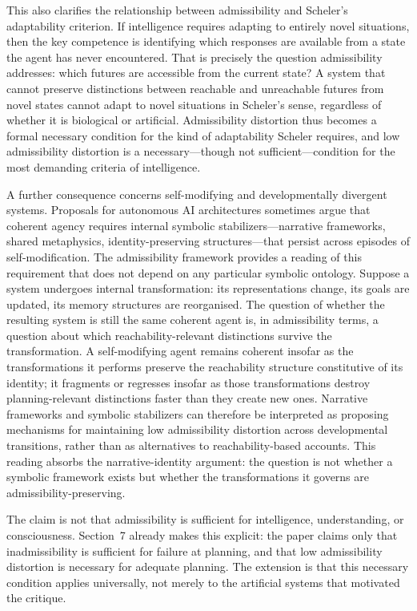 \documentclass[11pt, a4paper]{article}
\theoremstyle{plain}
\theoremstyle{definition}
\theoremstyle{remark}
\begin{document}
This also clarifies the relationship between admissibility and Scheler's adaptability criterion. If intelligence requires adapting to entirely novel situations, then the key competence is identifying which responses are available from a state the agent has never encountered. That is precisely the question admissibility addresses: which futures are accessible from the current state? A system that cannot preserve distinctions between reachable and unreachable futures from novel states cannot adapt to novel situations in Scheler's sense, regardless of whether it is biological or artificial. Admissibility distortion thus becomes a formal necessary condition for the kind of adaptability Scheler requires, and low admissibility distortion is a necessary---though not sufficient---condition for the most demanding criteria of intelligence.

A further consequence concerns self-modifying and developmentally divergent systems. Proposals for autonomous AI architectures sometimes argue that coherent agency requires internal symbolic stabilizers---narrative frameworks, shared metaphysics, identity-preserving structures---that persist across episodes of self-modification. The admissibility framework provides a reading of this requirement that does not depend on any particular symbolic ontology. Suppose a system undergoes internal transformation: its representations change, its goals are updated, its memory structures are reorganised. The question of whether the resulting system is still the same coherent agent is, in admissibility terms, a question about which reachability-relevant distinctions survive the transformation. A self-modifying agent remains coherent insofar as the transformations it performs preserve the reachability structure constitutive of its identity; it fragments or regresses insofar as those transformations destroy planning-relevant distinctions faster than they create new ones. Narrative frameworks and symbolic stabilizers can therefore be interpreted as proposing mechanisms for maintaining low admissibility distortion across developmental transitions, rather than as alternatives to reachability-based accounts. This reading absorbs the narrative-identity argument: the question is not whether a symbolic framework exists but whether the transformations it governs are admissibility-preserving.

The claim is not that admissibility is sufficient for intelligence, understanding, or consciousness. Section~7 already makes this explicit: the paper claims only that inadmissibility is sufficient for failure at planning, and that low admissibility distortion is necessary for adequate planning. The extension is that this necessary condition applies universally, not merely to the artificial systems that motivated the critique.
\end{document}
